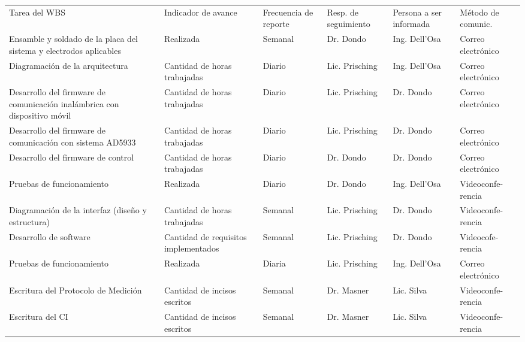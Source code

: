 \documentclass[11pt]{charter}
\begin{document}
\begin{table}[H]
\centering
\begin{tabularx}{\linewidth}{@{}|X|X|X|X|X|X|@{}}
\hline
\rowcolor[HTML]{C0C0C0} 
\multicolumn{6}{|c|}{\cellcolor[HTML]{C0C0C0}SEGUIMIENTO DE AVANCE}                                                                       \\ \hline
\rowcolor[HTML]{C0C0C0} 
Tarea del WBS & Indicador de avance & Frecuencia de reporte & Resp. de seguimiento & Persona a ser informada & Método de comunic. \\ \hline
Ensamble y soldado de la placa del sistema y electrodos aplicables  & Realizada & Semanal & Dr. Dondo & Ing. Dell'Osa & Correo electrónico \\ \hline
Diagramación de la arquitectura & Cantidad de horas trabajadas & Diario & Lic. Prisching & Ing. Dell'Osa & Correo electrónico \\ \hline
Desarrollo del firmware de comunicación inalámbrica con dispositivo móvil & Cantidad de horas trabajadas & Diario & Lic. Prisching & Dr. Dondo & Correo electrónico \\ \hline
Desarrollo del firmware de comunicación con sistema AD5933 & Cantidad de horas trabajadas & Diario & Lic. Prisching & Dr. Dondo & Correo electrónico \\ \hline
Desarrollo del firmware de control & Cantidad de horas trabajadas & Diario  & Dr. Dondo & Dr. Dondo & Correo electrónico \\ \hline
Pruebas de funcionamiento  & Realizada & Diario &  Dr. Dondo & Ing. Dell'Osa & Videoconfe- rencia \\ \hline
Diagramación de la interfaz (diseño y estructura) &  Cantidad de horas trabajadas & Semanal & Lic. Prisching & Dr. Dondo & Videoconfe- rencia \\ \hline
Desarrollo de software  & Cantidad de requisitos implementados & Semanal & Lic. Prisching & Dr. Dondo & Videocofe- rencia \\ \hline
Pruebas de funcionamiento & Realizada & Diaria & Lic. Prisching & Ing. Dell'Osa & Correo electrónico \\ \hline
Escritura del Protocolo de Medición & Cantidad de incisos escritos & Semanal & Dr. Masner & Lic. Silva & Videoconfe- rencia \\ \hline
Escritura del CI & Cantidad de incisos escritos  & Semanal & Dr. Masner & Lic. Silva & Videoconfe- rencia \\ \hline
\end{tabularx}%
\end{table}
\end{document}
